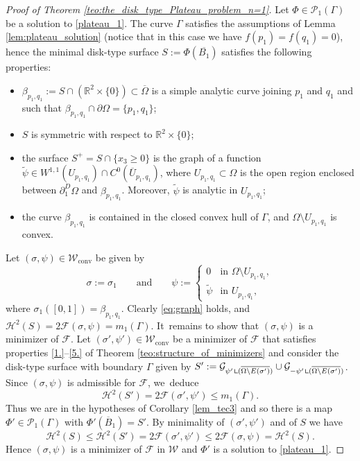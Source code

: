 \documentclass[11pt]{article}
\numberwithin{equation}{section}
\newcommand{\R}{\mathbb{R}}
\let\Om\Omega
\newcommand\admclassconv{{\mathcal W_\mathrm{conv}}}
\newcommand{\resa}{\mathop{\hbox{\vrule height 7pt width 0.5pt depth 0pt
\vrule height 0.5pt width 6pt depth 0pt}}\nolimits}
\newcommand{\resb}{\mathop{\hbox{\vrule height 4pt width 0.5pt depth 0pt
\vrule height 0.5pt width 3pt depth 0pt}}\nolimits}
\newcommand{\res}{\mathchoice{\resa}{\resa}{\resb}{\resb}}
\theoremstyle{definition}
\begin{document}
\begin{proof}[Proof of Theorem \ref{teo:the_disk_type_Plateau_problem_n=1}] Let $\Phi\in\mathcal{P}_1(\Gamma)$ be a solution to \eqref{plateau_1}.
The curve $\Gamma$
satisfies the assumptions
of Lemma \ref{lem:plateau_solution} (notice that in this case we have $f(p_1) = f(q_1)=0$), hence the minimal disk-type surface $S:=\Phi(\overline{B_1})$ satisfies the following properties:
\begin{itemize}
\item $\beta_{p_1,q_1}:=S\cap (\R^2\times\{0\})\subset \overline \Om$
is a simple analytic curve
joining $p_1$ and $q_1$ and such that $\beta_{p_1,q_1}\cap\partial\Om=\{p_1,q_1\}$;
\item $S$ is symmetric with respect to $\R^2\times\{0\}$;
\item the surface $S^+=S\cap\{x_3\ge0\}$ is the graph of a
function $\widetilde\psi\in W^{1,1}(U_{p_1,q_1})\cap C^0(\overline U_{p_1,q_1})$, where $U_{p_1,q_1}\subset \Om$ is the open region enclosed between $\partial_1^D\Om$ and $\beta_{p_1,q_1}$. Moreover, $\widetilde\psi$ is analytic in $U_{p_1,q_1}$;
\item the curve $\beta_{p_1,q_1}$ is contained in the closed
convex hull of $\Gamma$, and $\Om\setminus U_{p_1,q_1}$ is convex.
\end{itemize}

Let $(\sigma,\psi)\in\admclassconv$ be given by
\[
\sigma:=\sigma_1\qquad\text{and}\qquad
\psi:=\begin{cases}
0& \text{in } \Om\setminus U_{p_1,q_1},\\
\widetilde\psi & \text{in } U_{p_1,q_1},
\end{cases}
\]
where $\sigma_1([0,1])=\beta_{p_1,q_1}$.
Clearly \eqref{eq:graph} holds, and $\mathcal H^2(S)=2\mathcal F(\sigma,\psi)=m_1(\Gamma)$. It~remains to show that $(\sigma,\psi)$ is a minimizer of $\mathcal F$.
Let $(\sigma',\psi')\in\admclassconv$ be a minimizer of $\mathcal F$ that satisfies properties \ref{1.}--\ref{5.} of Theorem \ref{teo:structure_of_minimizers} and consider the disk-type surface with boundary $\Gamma$ given by $S':=\mathcal{G}_{\psi'\res(\overline{\Om\setminus E(\sigma')})}
\cup \mathcal{G}_{-\psi'\res(\overline{\Om\setminus E(\sigma')})}$.
Since $(\sigma,\psi)$ is admissible for $\mathcal F$, we~deduce
\[
\mathcal{H}^2(S')=2\mathcal F(\sigma',\psi')\leq m_1(\Gamma).
\]
Thus we are in the hypotheses of Corollary \ref{lem_tec3} and so there is a map
$\Phi'\in \mathcal P_1(\Gamma) $ with $\Phi'(\overline B_1)=S'$.
By minimality of $(\sigma',\psi')$ and of $S$ we have
\begin{equation}
\mathcal H^2(S)\le \mathcal{H}^2(S')=2\mathcal{F}(\sigma',\psi')\le 2\mathcal{F}(\sigma,\psi)=\mathcal H^2(S).
\end{equation}
Hence $(\sigma,\psi)$ is a minimizer of $\mathcal F$ in $\mathcal W$ and $\Phi'$ is a solution to \eqref{plateau_1}.


\end{proof}
\end{document}
